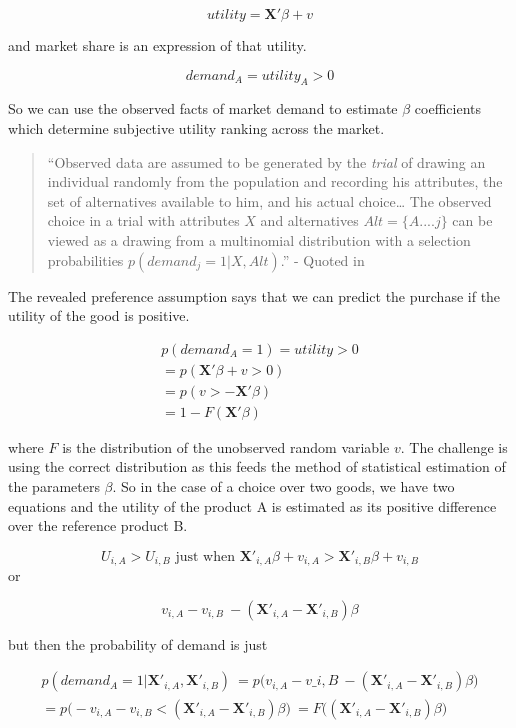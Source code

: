 \documentclass[]{tufte-book}
\theoremstyle{definition}
\theoremstyle{definition}
\theoremstyle{definition}
\theoremstyle{remark}
\begin{document}
\[ utility = \mathbf{X'}\beta + v\]

and market share is an expression of that utility.

\[ demand_A = utility_{A} > 0 \]

So we can use the observed facts of market demand to estimate \(\beta\) coefficients which determine subjective utility ranking across the market.

\begin{quote}
``Observed data are assumed to be generated by the \emph{trial} of drawing an individual randomly from the population and recording his attributes, the set of alternatives available to him, and his actual choice\ldots{} The observed choice in a trial with attributes \(X\) and alternatives \(Alt = \{A.... j \}\) can be viewed as a drawing from a multinomial distribution with a selection probabilities \(p(demand_{j} = 1| X, Alt)\).'' - Quoted in \citep{McFaddenCondLogit}
\end{quote}

The revealed preference assumption says that we can predict the purchase if the utility of the good is positive.

\begin{equation} \begin{split} p(demand_A = 1) = utility > 0 \\ = p(\mathbf{X'}\beta + v > 0) \\ = p(v > - \mathbf{X'}\beta ) \\ = 1 - F(\mathbf{X'}\beta ) \end{split} \end{equation}

where \(F\) is the distribution of the unobserved random variable \(v\). The challenge is using the correct distribution as this feeds the method of statistical estimation of the parameters \(\beta\). So in the case of a choice over two goods, we have two equations and the utility of the product A is estimated as its positive difference over the reference product B.

\[ U_{i,A} > U_{i, B} \text{ just when } \mathbf{X'}_{i, A}\beta + v_{i,A} > \mathbf{X'}_{i, B}\beta + v_{i,B}\] or

\[ v_{i,A} - v_{i,B} \> - (\mathbf{X'}_{i, A} - \mathbf{X'}_{i, B})\beta \]

but then the probability of demand is just

\begin{equation} \begin{split} p(demand_A = 1 | \mathbf{X'}_{i, A}, \mathbf{X'}_{i, B}) \ = p\Bigg( v_{i,A} - v\_{i,B} \> - (\mathbf{X'}_{i, A} - \mathbf{X'}_{i, B})\beta \Bigg) \\ = p\Bigg( -v_{i,A} - v_{i,B} < (\mathbf{X'}_{i, A} - \mathbf{X'}_{i, B})\beta \Bigg) \ = F\Bigg( (\mathbf{X'}_{i, A} - \mathbf{X'}_{i, B})\beta \Bigg) \end{split} \end{equation}
\end{document}
